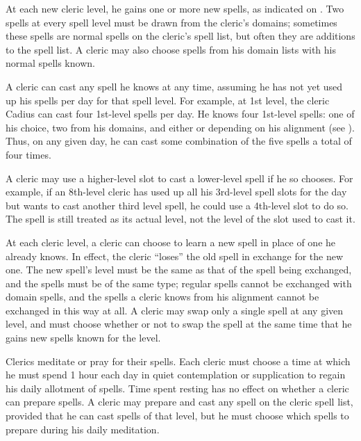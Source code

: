 At each new cleric level, he gains one or more new spells, as indicated on . Two spells at every spell level must be drawn from the cleric's domains; sometimes these spells are normal spells on the cleric's spell list, but often they are additions to the spell list. A cleric may also choose spells from his domain lists with his normal spells known.

\par A cleric can cast any spell he knows at any time, assuming he
has not yet used up his spells per day for that spell level. For
example, at 1st level, the cleric Cadius can cast four 1st-level
spells per day. He knows four 1st-level spells: one of his choice, two from his domains, and either  or  depending on his alignment (see ). Thus, on any given day, he can cast some combination of the five spells a total of four times.

\par A cleric may use a higher-level slot to cast a lower-level spell if he so chooses. For example, if an 8th-level cleric has used up all his 3rd-level spell slots for the day but wants to cast another third level spell, he could use a 4th-level slot to do so. The spell is still treated as its actual level, not the level of the slot used to cast it.

\par At each cleric level, a cleric can choose to learn a
new spell in place of one he already knows. In effect, the cleric ``loses''
the old spell in exchange for the new one. The new spell's
level must be the same as that of the spell being exchanged, and the spells
must be of the same type; regular
spells cannot be exchanged with domain spells, and the spells a cleric knows
from his alignment cannot be exchanged in this way at all. A cleric may swap only a single
spell at any given level, and must choose whether or not to swap the
spell at the same time that he gains new spells known for the level.

Clerics meditate or pray for their spells. Each cleric must choose a time at which he must spend 1 hour each day in quiet contemplation or supplication to regain his daily allotment of spells. Time spent resting has no effect on whether a cleric can prepare spells. A cleric may prepare and cast any spell on the cleric spell list, provided that he can cast spells of that level, but he must choose which spells to prepare during his daily meditation.

